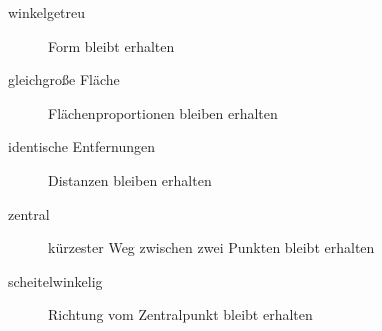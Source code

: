 \begin{description}
	\item[winkelgetreu] Form bleibt erhalten
	\item[gleichgroße Fläche] Flächenproportionen bleiben erhalten
	\item[identische Entfernungen] Distanzen bleiben erhalten
	\item[zentral] kürzester Weg zwischen zwei Punkten bleibt erhalten
	\item[scheitelwinkelig] Richtung vom Zentralpunkt bleibt erhalten
\end{description}